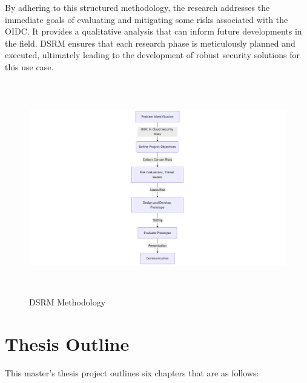 By adhering to this structured methodology, the research addresses the immediate goals of evaluating and mitigating some risks associated with the OIDC. It provides a qualitative analysis that can inform future developments in the field. DSRM ensures that each research phase is meticulously planned and executed, ultimately leading to the development of robust security solutions for this use case.

\begin{figure}[h!]
\centering
\label{fig:dsrm}
\includegraphics[width=\textwidth, height=350px]{pics/research_method.png}
\caption{DSRM Methodology}
\end{figure}
\newpage
\section{Thesis Outline}

This master's thesis project outlines six chapters that are as follows:

